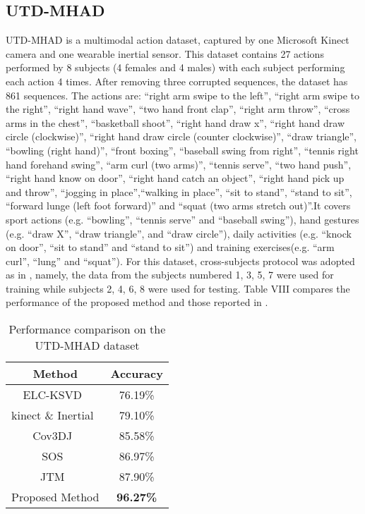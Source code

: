 \documentclass[10pt,journal]{IEEEtran}
\begin{document}
\subsection{UTD-MHAD}
UTD-MHAD \cite{Chen2015UTD} is a multimodal action dataset, captured
by one Microsoft Kinect camera and one wearable inertial
sensor. This dataset contains 27 actions performed by 8
subjects (4 females and 4 males) with each subject performing each action 4 times. After removing three corrupted sequences, the dataset has 861 sequences. The actions are: “right arm swipe to the left”, “right arm swipe to the right”, “right hand wave”, “two hand front clap”, “right arm throw”, “cross arms in the chest”, “basketball shoot”, “right hand draw x”, “right hand draw circle (clockwise)”, “right hand draw circle (counter clockwise)”, “draw triangle”, “bowling (right hand)”,
“front boxing”, “baseball swing from right”, “tennis right hand forehand swing”, “arm curl (two arms)”, “tennis serve”, “two hand push”, “right hand know on door”, “right hand catch an object”, “right hand pick up and throw”, “jogging in place”,“walking in place”, “sit to stand”, “stand to sit”, “forward lunge (left foot forward)” and “squat (two arms stretch out)”.It covers sport actions (e.g. “bowling”, “tennis serve” and “baseball swing”), hand gestures (e.g. “draw X”, “draw triangle”, and “draw circle”), daily activities (e.g. “knock on door”, “sit to stand” and “stand to sit”) and training exercises(e.g. “arm curl”, “lung” and “squat”). For this dataset, cross-subjects protocol was adopted as in \cite{Chen2015UTD}, namely, the data from the subjects numbered 1, 3, 5, 7 were used for training while subjects 2, 4, 6, 8 were used for testing. Table VIII compares the performance of the proposed method and those reported in \cite{Chen2015UTD}.



\begin{table}[htb]
\begin{center}
\caption{Performance comparison on the UTD-MHAD dataset \cite{Shahroudy2016NTU}} \label{tab:UTD-MHAD}
\begin{tabular}{  c  c }
\hline
Method              &Accuracy \\
\hline
ELC-KSVD~\cite{Zhou2014Discriminative} &76.19\%\\
kinect \& Inertial~\cite{Chen2015UTD} &79.10\%\\
Cov3DJ~\cite{Hussein2013Human}  &85.58\%\\
SOS~\cite{Hou2016Skeleton}  &86.97\%\\
JTM~\cite{Wang2016Action}& 87.90\%\\
Proposed Method     & \bf{96.27\%}\\
\hline
\end{tabular}
\end{center}
\end{table}
\end{document}

